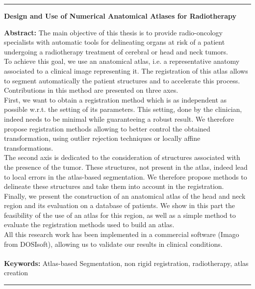 \documentclass[a4paper,12pt,twoside]{StyleThese}
\begin{document}
\begin{vcenterpage}
\noindent\rule[2pt]{\textwidth}{0.5pt}
\begin{center}
{\large\textbf{Design and Use of Numerical Anatomical Atlases for Radiotherapy\\}}
\end{center}
{\large\textbf{Abstract:}}
The main objective of this thesis is to provide radio-oncology specialists with automatic tools for delineating organs at risk of a patient undergoing a radiotherapy treatment of cerebral or head and neck tumors.
\\
To achieve this goal, we use an anatomical atlas, i.e. a representative anatomy associated to a clinical image representing it. The registration of this atlas allows to segment automatically the patient structures and to accelerate this process. Contributions in this method are presented on three axes.
\\
First, we want to obtain a registration method which is as independent as possible w.r.t. the setting of its parameters. This setting, done by the clinician, indeed needs to be minimal while guaranteeing a robust result. We therefore propose registration methods allowing to better control the obtained transformation, using outlier rejection techniques or locally affine transformations.
\\
The second axis is dedicated to the consideration of structures associated with the presence of the tumor. These structures, not present in the atlas, indeed lead to local errors in the atlas-based segmentation. We therefore propose methods to delineate these structures and take them into account in the registration.
\\
Finally, we present the construction of an anatomical atlas of the head and neck region and its evaluation on a database of patients. We show in this part the feasibility of the use of an atlas for this region, as well as a simple method to evaluate the registration methods used to build an atlas.
\\
All this research work has been implemented in a commercial software (Imago from DOSIsoft), allowing us to validate our results in clinical conditions.
\\
\\
{\large\textbf{Keywords:}}
Atlas-based Segmentation, non rigid registration, radiotherapy, atlas creation
\\
\noindent\rule[2pt]{\textwidth}{0.5pt}
\end{vcenterpage}
\end{document}
